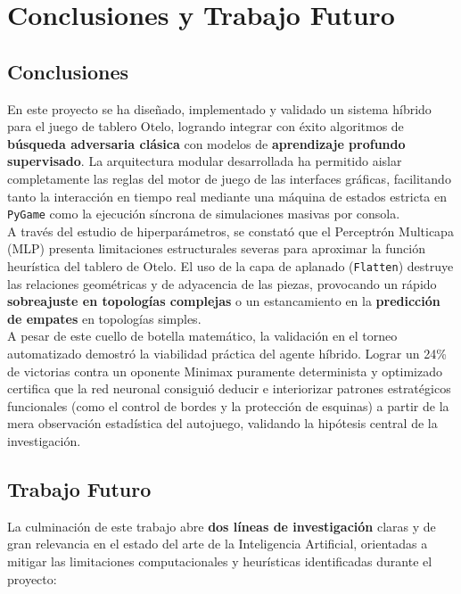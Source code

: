 \documentclass[conference]{IEEEtran}
\begin{document}
\section{Conclusiones y Trabajo Futuro}

\subsection{Conclusiones}
En este proyecto se ha diseñado, implementado y validado un sistema híbrido para el juego de tablero Otelo, logrando integrar con éxito algoritmos de \textbf{búsqueda 
adversaria clásica} con modelos de \textbf{aprendizaje profundo supervisado}. La arquitectura modular desarrollada ha permitido aislar completamente las reglas del 
motor de juego de las interfaces gráficas, facilitando tanto la interacción en tiempo real mediante una máquina de estados estricta en \texttt{PyGame} como 
la ejecución síncrona de simulaciones masivas por consola.\\

A través del estudio de hiperparámetros, se constató que el Perceptrón Multicapa (MLP) presenta limitaciones estructurales severas para aproximar 
la función heurística del tablero de Otelo. El uso de la capa de aplanado (\texttt{Flatten}) destruye las relaciones geométricas y de adyacencia de las piezas, provocando un 
rápido \textbf{sobreajuste en topologías complejas} o un estancamiento en la \textbf{predicción de empates} en topologías simples.\\ 

A pesar de este cuello de botella matemático, la validación en el torneo automatizado demostró la viabilidad práctica del agente híbrido. Lograr un 24\% de victorias 
contra un oponente Minimax puramente determinista y optimizado certifica que la red neuronal consiguió deducir e interiorizar patrones estratégicos funcionales (como el control de 
bordes y la protección de esquinas) a partir de la mera observación estadística del autojuego, validando la hipótesis central de la investigación.

\subsection{Trabajo Futuro}
La culminación de este trabajo abre \textbf{dos líneas de investigación} claras y de gran relevancia en el estado del arte de la Inteligencia Artificial, orientadas a mitigar 
las limitaciones computacionales y heurísticas identificadas durante el proyecto:
\end{document}

